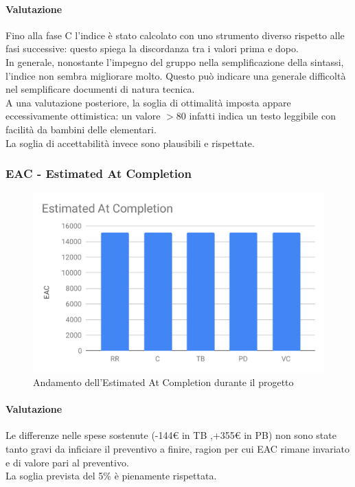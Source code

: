 \paragraph*{Valutazione}
Fino alla fase C l'indice è stato calcolato con uno strumento diverso rispetto alle fasi successive: questo spiega la discordanza tra i valori prima e dopo.\\
In generale, nonostante l'impegno del gruppo nella semplificazione della sintassi, l'indice non sembra migliorare molto.
Questo può indicare una generale difficoltà nel semplificare documenti di natura tecnica.\\
A una valutazione posteriore, la soglia di ottimalità imposta appare eccessivamente ottimistica: un valore $>80$ infatti indica un testo leggibile con facilità da bambini delle elementari.\\
La soglia di accettabilità invece sono plausibili e rispettate. 


\subsubsection{EAC - Estimated At Completion}
\begin{figure}[H]
	\centering
	\includegraphics[scale=0.7]{res/images/RA/eac.pdf}
	\caption{Andamento dell'Estimated At Completion durante il progetto}
\end{figure}
\paragraph*{Valutazione}
Le differenze nelle spese sostenute (-144\euro{} in TB ,+355\euro{} in PB) non sono state tanto gravi da inficiare il preventivo a finire, ragion per cui EAC rimane invariato e di valore pari al preventivo.\\
La soglia prevista del 5\% è pienamente rispettata.

